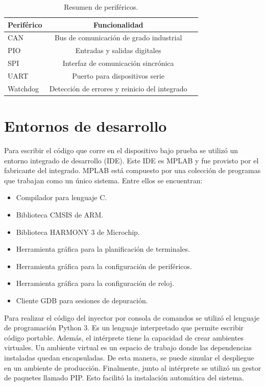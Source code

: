 \begin{table}[h]
	\centering
	\caption[Resumen de periféricos]{Resumen de periféricos.}
	\begin{tabular}{l c c}    
		\toprule
        \textbf{Periférico} & \textbf{Funcionalidad}\\
		\midrule
		CAN                 & Bus de comunicación de grado industrial\\        	
		PIO                 & Entradas y salidas digitales\\
		SPI                 & Interfaz de comunicación sincrónica\\
		UART                & Puerto para dispositivos serie\\
		Watchdog            & Detección de errores y reinicio del integrado\\
		\bottomrule
		\hline
	\end{tabular}
	\label{tab:perifericosresumen}
\end{table}

\section{Entornos de desarrollo}
\label{sec:entornos}

Para escribir el código que corre en el dispositivo bajo prueba se utilizó un entorno integrado de desarrollo (IDE).
Este IDE es MPLAB y fue provisto por el fabricante del integrado.
MPLAB está compuesto por una colección de programas que trabajan como un único sistema.
Entre ellos se encuentran:

\begin{itemize}
    \item Compilador para lenguaje C.
    \item Biblioteca CMSIS de ARM.
    \item Biblioteca HARMONY 3 de Microchip.
    \item Herramienta gráfica para la planificación de terminales.
    \item Herramienta gráfica para la configuración de periféricos.
    \item Herramienta gráfica para la configuración de reloj.
    \item Cliente GDB para sesiones de depuración.
\end{itemize}

Para realizar el código del inyector por consola de comandos se utilizó el lenguaje de programación Python 3.
Es un lenguaje interpretado que permite escribir código portable.
Además, el intérprete tiene la capacidad de crear ambientes virtuales.
Un ambiente virtual es un espacio de trabajo donde las dependencias instaladas quedan encapsuladas.
De esta manera, se puede simular el despliegue en un ambiente de producción.
Finalmente, junto al intérprete se utilizó un gestor de paquetes llamado PIP.
Esto facilitó la instalación automática del sistema.

